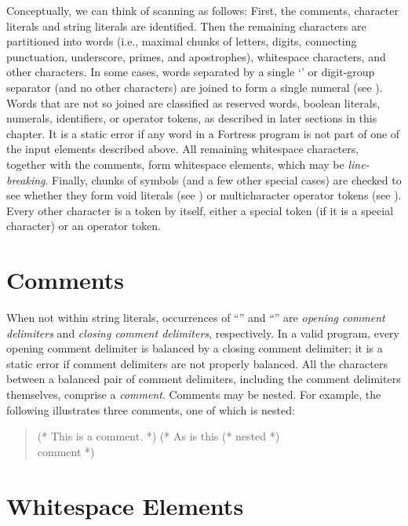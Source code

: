 Conceptually,
we can think of scanning as follows:
First, the comments,
character literals and string literals
are identified.
Then the remaining characters are partitioned into
words
(i.e., maximal chunks of
letters, digits, connecting punctuation,
underscore, primes, and apostrophes),
whitespace characters,
and other characters.
In some cases,
words separated by a single `'
or digit-group separator (and no other characters)
are joined to form a single numeral
(see ).
Words that are not so joined
are classified as reserved words,
boolean literals, numerals, identifiers, or operator tokens,
as described in later sections in this chapter.
It is a static error
if any word in a Fortress program
is not part of one of the input elements described above.
All remaining whitespace characters,
together with the comments,
form whitespace elements,
which may be \emph{line-breaking}.
Finally,
chunks of symbols
(and a few other special cases)
are checked to see whether they form
void literals (see )
or multicharacter operator tokens
(see ).
Every other character is a token by itself,
either a special token
(if it is a special character)
or an operator token.


\section{Comments}


When not within string literals,
occurrences of ``\EXP{(*}'' and ``\EXP{*)}''
are \emph{opening comment delimiters}
and \emph{closing comment delimiters}, respectively.
In a valid program,
every opening comment delimiter
is balanced by a closing comment delimiter;
it is a static error if comment delimiters are not properly balanced.
All the characters between a balanced pair of comment delimiters,
including the comment delimiters themselves,
comprise a \emph{comment}.
Comments may be nested.
For example, the following illustrates three comments,
one of which is nested:
\begin{quote}
(* This is a comment. *)  (* As is this (* nested *) \\ comment *)
\end{quote}


\section{Whitespace Elements}

